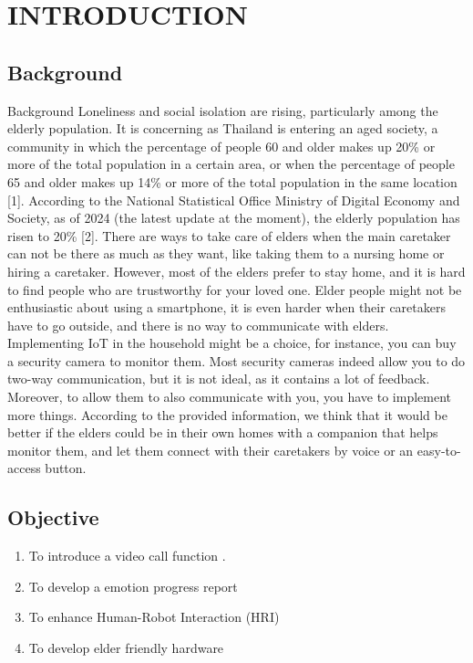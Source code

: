 \chapter{INTRODUCTION}

\section{Background}
 Background 
Loneliness and social isolation are rising, particularly among the elderly population. It is concerning as Thailand is entering an aged society, a community in which the percentage of people 60 and older makes up 20\% or more of the total population in a certain area, or when the percentage of people 65 and older makes up 14\% or more of the total population in the same location [1]. According to the National Statistical Office Ministry of Digital Economy and Society, as of 2024 (the latest update at the moment), the elderly population has risen to 20\% [2]. There are ways to take care of elders when the main caretaker can not be there as much as they want, like taking them to a nursing home or hiring a caretaker. However, most of the elders prefer to stay home, and it is hard to find people who are trustworthy for your loved one. Elder people might not be enthusiastic about using a smartphone, it is even harder when their caretakers have to go outside, and there is no way to communicate with elders. Implementing IoT in the household might be a choice, for instance, you can buy a security camera to monitor them. Most security cameras indeed allow you to do two-way communication, but it is not ideal, as it contains a lot of feedback. Moreover, to allow them to also communicate with you, you have to implement more things. According to the provided information, we think that it would be better if the elders could be in their own homes with a companion that helps monitor them, and let them connect with their caretakers by voice or an easy-to-access button. 


\section{Objective}
\noindent\hspace{1.5em}
\begin{enumerate}
	\item To introduce a video call function .
	\item To develop a emotion progress report
	\item To enhance Human-Robot Interaction (HRI)
	\item To develop elder friendly hardware
\end{enumerate}

